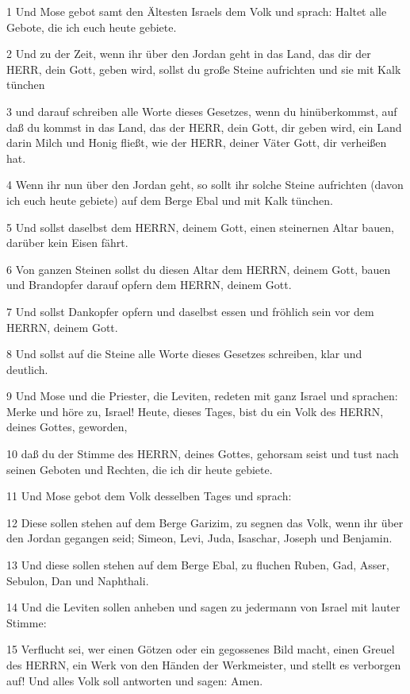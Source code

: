 \par 1 Und Mose gebot samt den Ältesten Israels dem Volk und sprach: Haltet alle Gebote, die ich euch heute gebiete.
\par 2 Und zu der Zeit, wenn ihr über den Jordan geht in das Land, das dir der HERR, dein Gott, geben wird, sollst du große Steine aufrichten und sie mit Kalk tünchen
\par 3 und darauf schreiben alle Worte dieses Gesetzes, wenn du hinüberkommst, auf daß du kommst in das Land, das der HERR, dein Gott, dir geben wird, ein Land darin Milch und Honig fließt, wie der HERR, deiner Väter Gott, dir verheißen hat.
\par 4 Wenn ihr nun über den Jordan geht, so sollt ihr solche Steine aufrichten (davon ich euch heute gebiete) auf dem Berge Ebal und mit Kalk tünchen.
\par 5 Und sollst daselbst dem HERRN, deinem Gott, einen steinernen Altar bauen, darüber kein Eisen fährt.
\par 6 Von ganzen Steinen sollst du diesen Altar dem HERRN, deinem Gott, bauen und Brandopfer darauf opfern dem HERRN, deinem Gott.
\par 7 Und sollst Dankopfer opfern und daselbst essen und fröhlich sein vor dem HERRN, deinem Gott.
\par 8 Und sollst auf die Steine alle Worte dieses Gesetzes schreiben, klar und deutlich.
\par 9 Und Mose und die Priester, die Leviten, redeten mit ganz Israel und sprachen: Merke und höre zu, Israel! Heute, dieses Tages, bist du ein Volk des HERRN, deines Gottes, geworden,
\par 10 daß du der Stimme des HERRN, deines Gottes, gehorsam seist und tust nach seinen Geboten und Rechten, die ich dir heute gebiete.
\par 11 Und Mose gebot dem Volk desselben Tages und sprach:
\par 12 Diese sollen stehen auf dem Berge Garizim, zu segnen das Volk, wenn ihr über den Jordan gegangen seid; Simeon, Levi, Juda, Isaschar, Joseph und Benjamin.
\par 13 Und diese sollen stehen auf dem Berge Ebal, zu fluchen Ruben, Gad, Asser, Sebulon, Dan und Naphthali.
\par 14 Und die Leviten sollen anheben und sagen zu jedermann von Israel mit lauter Stimme:
\par 15 Verflucht sei, wer einen Götzen oder ein gegossenes Bild macht, einen Greuel des HERRN, ein Werk von den Händen der Werkmeister, und stellt es verborgen auf! Und alles Volk soll antworten und sagen: Amen.
